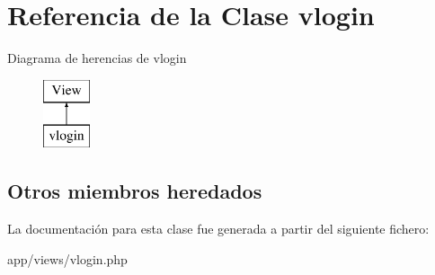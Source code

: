 \hypertarget{classvlogin}{}\section{Referencia de la Clase vlogin}
\label{classvlogin}
Diagrama de herencias de vlogin\begin{figure}[H]
\begin{center}
\leavevmode
\includegraphics[height=2.000000cm]{classvlogin}
\end{center}
\end{figure}
\subsection*{Otros miembros heredados}


La documentación para esta clase fue generada a partir del siguiente fichero\+:\begin{DoxyCompactItemize}
\item 
app/views/vlogin.\+php\end{DoxyCompactItemize}
